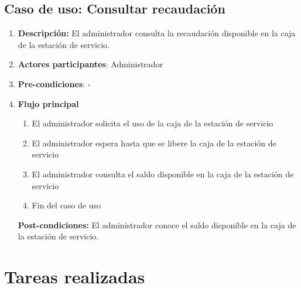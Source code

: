 \documentclass[12pt,a4paper,titlepage,oneside]{article}
\begin{document}
\subsection{Caso de uso: Consultar recaudación}

\begin{enumerate}
\item \textbf{Descripción:} El administrador consulta la recaudación disponible en la caja de la estación de servicio.
\item \textbf{Actores participantes}: Administrador
\item \textbf{Pre-condiciones}: -
\item \textbf{Flujo principal}
\begin{enumerate}
\item El administrador solicita el uso de la caja de la estación de servicio
\item El administrador espera hasta que se libere la caja de la estación de servicio
\item El administrador consulta el saldo disponible en la caja de la estación de servicio
\item Fin del caso de uso
\end{enumerate}
\textbf{Post-condiciones:} El administrador conoce el saldo disponible en la caja de la estación de servicio.
\end{enumerate}

\section{Tareas realizadas}
\end{document}
